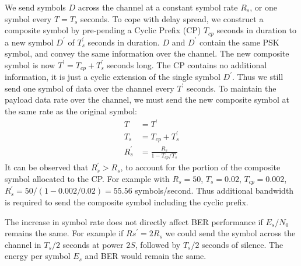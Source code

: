 \documentclass{article}
\begin{document}
We send symbols $D$ across the channel at a constant symbol rate $R_s$, or one symbol every $T=T_s$ seconds.  To cope with delay spread, we construct a composite symbol by pre-pending a Cyclic Prefix (CP) $T_{cp}$ seconds in duration to a new symbol $D^\prime$ of $T^\prime_s$ seconds in duration.  $D$ and $D^\prime$ contain the same PSK symbol, and convey the same information over the channel. The new composite symbol is now $T^\prime = T_{cp}+T^\prime_s$ seconds long.  The CP contains no additional information, it is just a cyclic extension of the single symbol $D^\prime$. Thus we still send one symbol of data over the channel every $T^\prime$ seconds.  To maintain the payload data rate over the channel, we must send the new composite symbol at the same rate as the original symbol:
\begin{equation}
\begin{split}
T &= T^\prime \\
T_s &= T_{cp} + T^\prime_s \\
R^\prime_s &= \frac{R_s}{1 - T_{cp}/T_s}
\end{split}
\end{equation}
It can be observed that $R^\prime_s > R_s$, to account for the portion of the composite symbol allocated to the CP.  For example with $R_s=50$, $T_s=0.02$, $T_{cp}=0.002$, $R^\prime_s=50/(1-0.002/0.02)=55.56$ symbols/second.  Thus additional bandwidth is required to send the composite symbol including the cyclic prefix.

The increase in symbol rate does not directly affect BER performance if $E_s/N_0$ remains the same. For example if $Rs^\prime=2R_s$ we could send the symbol across the channel in $T_s/2$ seconds at power $2S$, followed by $T_s/2$ seconds of silence.  The energy per symbol $E_s$ and BER would remain the same.
\end{document}

